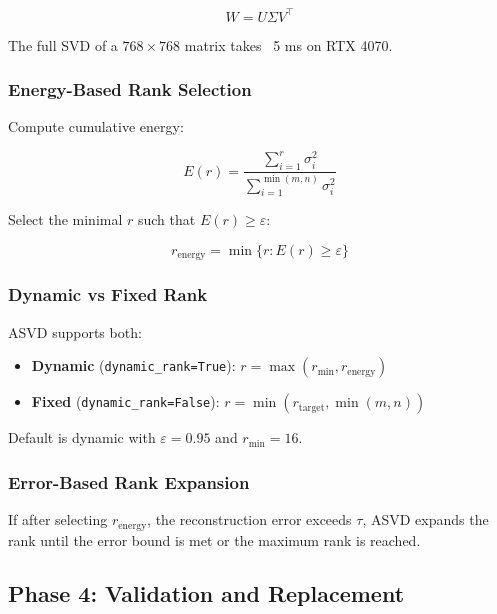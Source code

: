 \begin{equation}
W = U \Sigma V^\top
\end{equation}

The full SVD of a $768 \times 768$ matrix takes ~5 ms on RTX 4070.

\subsubsection{Energy-Based Rank Selection}

Compute cumulative energy:

\begin{equation}
E(r) = \frac{\sum_{i=1}^r \sigma_i^2}{\sum_{i=1}^{\min(m, n)} \sigma_i^2}
\end{equation}

Select the minimal $r$ such that $E(r) \geq \varepsilon$:

\begin{equation}
r_\text{energy} = \min\{r : E(r) \geq \varepsilon\}
\end{equation}

\subsubsection{Dynamic vs Fixed Rank}

ASVD supports both:

\begin{itemize}
\item \textbf{Dynamic} (\texttt{dynamic\_rank=True}): $r = \max(r_\text{min}, r_\text{energy})$
\item \textbf{Fixed} (\texttt{dynamic\_rank=False}): $r = \min(r_\text{target}, \min(m, n))$

\end{itemize}
Default is dynamic with $\varepsilon = 0.95$ and 
$r_\text{min} = 16$.

\subsubsection{Error-Based Rank Expansion}

If after selecting $r_\text{energy}$, the reconstruction error exceeds 
$\tau$, ASVD expands the rank until the error bound is met or the maximum 
rank is reached.

\subsection{Phase 4: Validation and Replacement}

